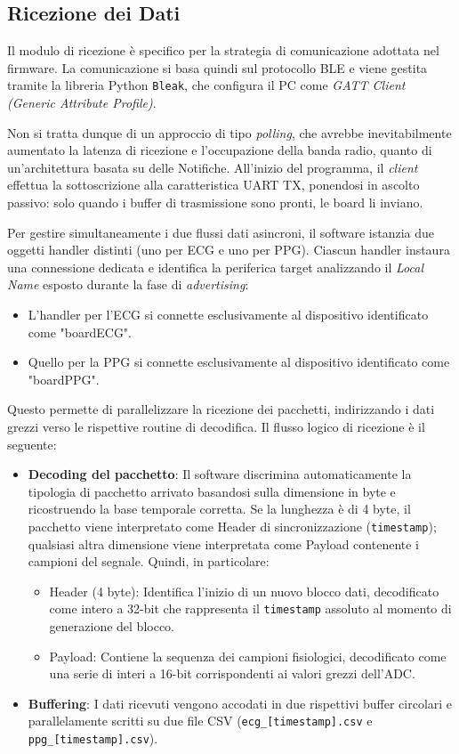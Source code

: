 \documentclass[11pt,a4paper]{article}
\begin{document}
\subsection{Ricezione dei Dati}

Il modulo di ricezione è specifico per la strategia di comunicazione adottata nel firmware. La comunicazione si basa quindi sul protocollo BLE e viene gestita tramite la libreria Python \texttt{Bleak}, che configura il PC come \textit{GATT Client (Generic Attribute Profile)}. 

Non si tratta dunque di un approccio di tipo \textit{polling}, che avrebbe inevitabilmente aumentato la latenza di ricezione e l'occupazione della banda radio, quanto di un'architettura basata su delle Notifiche. All'inizio del programma, il \textit{client} effettua la sottoscrizione alla caratteristica UART TX, ponendosi in ascolto passivo: solo quando i buffer di trasmissione sono pronti, le board li inviano.

Per gestire simultaneamente i due flussi dati asincroni, il software istanzia due oggetti handler distinti (uno per ECG e uno per PPG). Ciascun handler instaura una connessione dedicata e identifica la periferica target analizzando il \textit{Local Name} esposto durante la fase di \textit{advertising}:
\begin{itemize}
    \item L'handler per l'ECG si connette esclusivamente al dispositivo identificato come "boardECG".
    \item Quello per la PPG si connette esclusivamente al dispositivo identificato come "boardPPG".
\end{itemize}

Questo permette di parallelizzare la ricezione dei pacchetti, indirizzando i dati grezzi verso le rispettive routine di decodifica. Il flusso logico di ricezione è il seguente: 

\begin{itemize}
    \item \textbf{Decoding del pacchetto}: Il software discrimina automaticamente la tipologia di pacchetto arrivato basandosi sulla dimensione in byte e ricostruendo la base temporale corretta. Se la lunghezza è di 4 byte, il pacchetto viene interpretato come Header di sincronizzazione (\texttt{timestamp}); qualsiasi altra dimensione viene interpretata come Payload contenente i campioni del segnale. Quindi, in particolare:
    \begin{itemize}
        \item Header (4 byte): Identifica l'inizio di un nuovo blocco dati, decodificato come intero a 32-bit che rappresenta il \texttt{timestamp} assoluto al momento di generazione del blocco.
        \item 
        Payload: Contiene la sequenza dei campioni fisiologici, decodificato come una serie di interi a 16-bit corrispondenti ai valori grezzi dell'ADC.
    \end{itemize}
    \item \textbf{Buffering}: I dati ricevuti vengono accodati in due rispettivi buffer circolari e parallelamente scritti su due file CSV (\texttt{ecg\_[timestamp].csv} e \texttt{ppg\_[timestamp].csv}).
\end{itemize}
\end{document}
